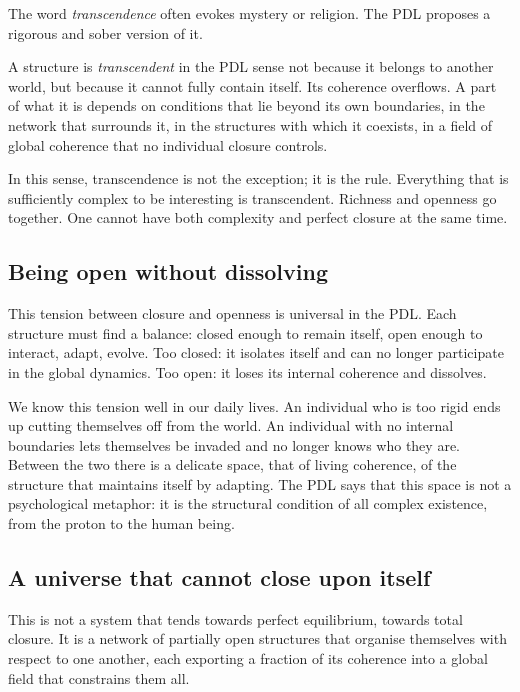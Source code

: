 \documentclass[11pt, a4paper, openright]{book}
\begin{document}
The word \emph{transcendence} often evokes mystery or religion. The PDL proposes a rigorous and sober version of it.

\medskip

A structure is \emph{transcendent} in the PDL sense not because it belongs to another world, but because it cannot fully contain itself. Its coherence overflows. A part of what it is depends on conditions that lie beyond its own boundaries, in the network that surrounds it, in the structures with which it coexists, in a field of global coherence that no individual closure controls.

\medskip

In this sense, transcendence is not the exception; it is the rule. Everything that is sufficiently complex to be interesting is transcendent. Richness and openness go together. One cannot have both complexity and perfect closure at the same time.

\subsection*{Being open without dissolving}

This tension between closure and openness is universal in the PDL. Each structure must find a balance: closed enough to remain itself, open enough to interact, adapt, evolve. Too closed: it isolates itself and can no longer participate in the global dynamics. Too open: it loses its internal coherence and dissolves.

\medskip

We know this tension well in our daily lives. An individual who is too rigid ends up cutting themselves off from the world. An individual with no internal boundaries lets themselves be invaded and no longer knows who they are. Between the two there is a delicate space, that of living coherence, of the structure that maintains itself by adapting. The PDL says that this space is not a psychological metaphor: it is the structural condition of all complex existence, from the proton to the human being.

\subsection*{A universe that cannot close upon itself}

This is not a system that tends towards perfect equilibrium, towards total closure. It is a network of partially open structures that organise themselves with respect to one another, each exporting a fraction of its coherence into a global field that constrains them all.
\end{document}
